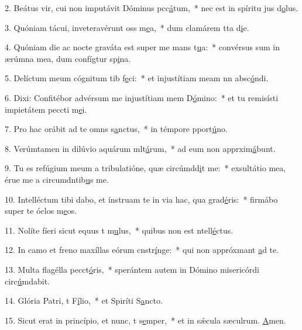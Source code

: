 2. Beátus vir, cui non imputávit Dóminus pcc\uline{á}tum,~* nec est in spíritu jus d\uline{o}lus.\par 
3. Quóniam tácui, inveteravérunt oss m\uline{e}a,~* dum clamárem tta d\uline{i}e.\par 
4. Quóniam die ac nocte graváta est super me mans t\uline{u}a:~* convérsus sum in ærúmna mea, dum confígtur sp\uline{i}na.\par 
5. Delíctum meum cógnitum tib f\uline{e}ci:~* et injustítiam meam nn absc\uline{ó}ndi.\par 
6. Dixi: Confitébor advérsum me injustítiam mem D\uline{ó}mino:~* et tu remisísti impietátem peccti m\uline{e}i.\par 
7. Pro hac orábit ad te omns s\uline{a}nctus,~* in témpore pport\uline{ú}no.\par 
8. Verúmtamen in dilúvio aquárum mlt\uline{á}rum,~* ad eum non apprxim\uline{á}bunt.\par 
9. Tu es refúgium meum a tribulatióne, quæ circúmdd\uline{i}t me:~* exsultátio mea, érue me a circumdntib\uline{u}s me.\par 
10. Intelléctum tibi dabo, et ínstruam te in via hac, qua grad\uline{é}ris:~* firmábo super te óclos m\uline{e}os.\par 
11. Nolíte fíeri sicut equus t m\uline{u}lus,~* quibus non est ntell\uline{é}ctus.\par 
12. In camo et freno maxíllas eórum cnstr\uline{í}nge:~* qui non appróxmant \uline{a}d te.\par 
13. Multa flagélla pecct\uline{ó}ris,~* sperántem autem in Dómino misericórdi circ\uline{ú}mdabit.\par 
14. Glória Patri, t F\uline{í}lio,~* et Spiríti S\uline{a}ncto.\par 
15. Sicut erat in princípio, et nunc, t s\uline{e}mper,~* et in sǽcula sæculrum. \uline{A}men.\par 
